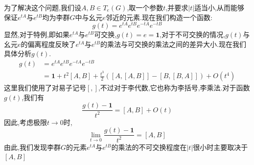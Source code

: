 为了解决这个问题,我们设$A,B\in T_e(G)$,取一个参数$t$,并要求$|t|$适当小,从而能够保证$e^{tA}$与$e^{tB}$均为李群$G$中与幺元$e$邻近的元素.现在我们构造一个函数:
\begin{equation}
    g(t)=e^{tA}e^{tB}e^{-tA}e^{-tB}
\end{equation}
显然,对于特例,即如果$e^{tA}$与$e^{tB}$可交换,$g(t)=e=\textbf{1}$,对于不可交换的情况,$g(t)$与幺元$e$的偏离程度反映了$e^{tA}$与$e^{tB}$的乘法与可交换的乘法之间的差异大小.现在我们具体分析$g(t)$.
\begin{equation}
    \begin{aligned}
        g(t)& =e^{tA}e^{tB}e^{-tA}e^{-tB} \\
        &=\textbf{1}+t^{2}[A,B]+\frac{t^{3}}{2}([A,[A,B]]-[B,[B,A]])+O(t^{4})
    \end{aligned}
\end{equation}
这里我们使用了对易子记号$[,]$,不过对于李代数,它也称为李括号,李乘法.对于函数$g(t)$,我们有
\begin{equation}
    \frac{g(t)-\textbf{1}}{t^2}=[A,B]+O(t)
\end{equation}
因此,考虑极限$t\to0$时,
\begin{equation}
    \lim_{t\to0}\frac{g(t)-\textbf{1}}{t^{2}}=[A,B]
\end{equation}
由此,我们发现李群$G$的元素$e^{tA}$与$e^{tB}$的乘法的不可交换程度在$|t|$很小时主要取决于$[A,B]$

